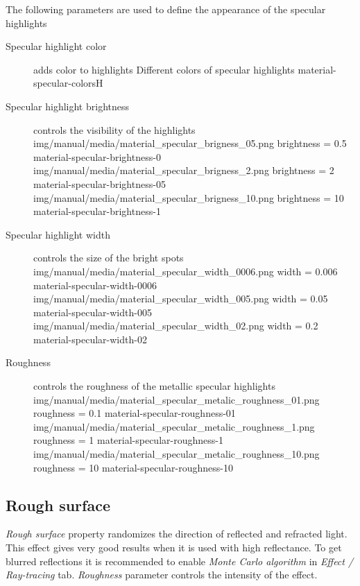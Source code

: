 The following parameters are used to define the appearance of the specular highlights
\begin{description}
	\item[Specular highlight color] adds color to highlights
	{Different colors of specular highlights}
	{material-specular-colors}{H}

	\item[Specular highlight brightness] controls the visibility of the highlights
	\threeImagesWithTwoCaptionsFullWidth
	{img/manual/media/material_specular_brigness_05.png}
	{brightness = 0.5}
	{material-specular-brightness-0}
	{img/manual/media/material_specular_brigness_2.png}
	{brightness = 2}
	{material-specular-brightness-05}
	{img/manual/media/material_specular_brigness_10.png}
	{brightness = 10}
	{material-specular-brightness-1}
	
	\item[Specular highlight width] controls the size of the bright spots
	\threeImagesWithTwoCaptionsFullWidth
	{img/manual/media/material_specular_width_0006.png}
	{width = 0.006}
	{material-specular-width-0006}
	{img/manual/media/material_specular_width_005.png}
	{width = 0.05}
	{material-specular-width-005}
	{img/manual/media/material_specular_width_02.png}
	{width = 0.2}
	{material-specular-width-02}
	
	\item[Roughness] controls the roughness of the metallic specular highlights
	\threeImagesWithTwoCaptionsFullWidth
	{img/manual/media/material_specular_metalic_roughness_01.png}
	{roughness = 0.1}
	{material-specular-roughness-01}
	{img/manual/media/material_specular_metalic_roughness_1.png}
	{roughness = 1}
	{material-specular-roughness-1}
	{img/manual/media/material_specular_metalic_roughness_10.png}
	{roughness = 10}
	{material-specular-roughness-10}	
		
\end{description}

\subsection{Rough surface}\label{materials-roughness}

\emph{Rough surface} property randomizes the direction of reflected and refracted light. This effect gives very good results when it is used with high reflectance. To get blurred reflections it is recommended to enable \emph{Monte Carlo algorithm} in \emph{Effect / Ray-tracing} tab. \emph{Roughness} parameter controls the intensity of the effect.

